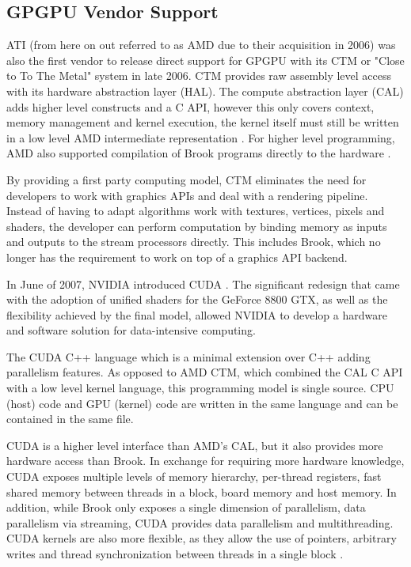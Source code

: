 \subsection{GPGPU Vendor Support}

ATI (from here on out referred to as AMD due to their acquisition in 2006) was also the first vendor to release direct support for GPGPU with its CTM or "Close to To The Metal" system in late 2006. CTM provides raw assembly level access with its hardware abstraction layer (HAL). The compute abstraction layer (CAL) adds higher level constructs and a C API, however this only covers context, memory management and kernel execution, the kernel itself must still be written in a low level AMD intermediate representation \cite{amd_ctm_programming_guide}. For higher level programming, AMD also supported compilation of Brook programs directly to the hardware \cite{gpu_computing}.

By providing a first party computing model, CTM eliminates the need for developers to work with graphics APIs and deal with a rendering pipeline. Instead of having to adapt algorithms work with textures, vertices, pixels and shaders, the developer can perform computation by binding memory as inputs and outputs to the stream processors directly. This includes Brook, which no longer has the requirement to work on top of a graphics API backend.

In June of 2007, NVIDIA introduced CUDA \cite{cuda_toolkit_archive}. The significant redesign that came with the adoption of unified shaders for the GeForce 8800 GTX, as well as the flexibility achieved by the final model, allowed NVIDIA to develop a hardware and software solution for data-intensive computing. 

The CUDA C++ language which is a minimal extension over C++ adding parallelism features. As opposed to AMD CTM, which combined the CAL C API with a low level kernel language, this programming model is single source. CPU (host) code and GPU (kernel) code are written in the same language and can be contained in the same file. 

CUDA is a higher level interface than AMD's CAL, but it also provides more hardware access than Brook. In exchange for requiring more hardware knowledge, CUDA exposes multiple levels of memory hierarchy, per-thread registers, fast shared memory between threads in a block, board memory and host memory. In addition, while Brook only exposes a single dimension of parallelism, data parallelism via streaming, CUDA provides data parallelism and multithreading. CUDA kernels are also more flexible, as they allow the use of pointers, arbitrary writes and thread synchronization between threads in a single block \cite{gpu_computing}.

